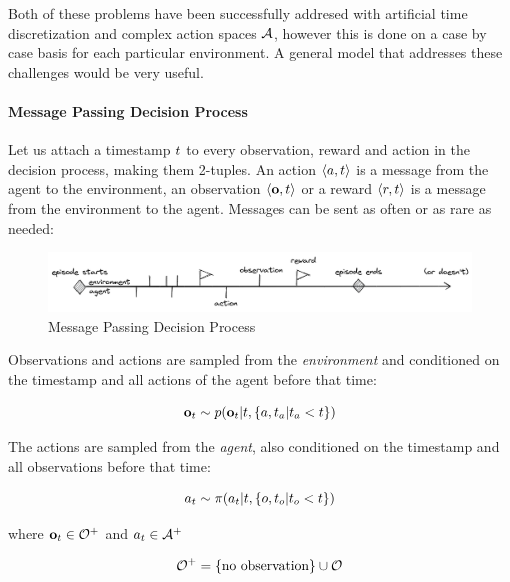 Both of these problems have been successfully addresed with artificial time discretization and complex action spaces $\mathcal{A}$, however this is done on a case by case basis for each particular environment. A general model that addresses these challenges would be very useful.

\paragraph{Message Passing Decision Process}

Let us attach a timestamp $t$ to every observation, reward and action in the decision process, making them 2-tuples. An action $\langle a, t\rangle$ is a message from the agent to the environment, an observation $\langle \mathbf{o}, t \rangle$ or a reward $\langle r, t \rangle$ is a message from the environment
to the agent. Messages can be sent as often or as rare as needed:

\begin{figure}
\centering
\includegraphics[width=\linewidth]{images/mpdp.png}
\caption{Message Passing Decision Process}
\end{figure}

Observations and actions are sampled from the \emph{environment} and conditioned on the timestamp and all actions of the agent before that time:

\begin{equation}
    \mathbf{o}_t \sim p(\mathbf{o}_t|t,\{a, t_a | t_a < t\})
\end{equation}

The actions are sampled from the \emph{agent}, also conditioned on the
timestamp and all observations before that time:

\begin{equation}
a_t \sim \pi(a_t|t, \{ o, t_o | t_o < t \})
\end{equation}

where $\mathbf{o}_t \in \mathcal{O}^{+}$
and $a_t \in \mathcal{A}^{+}$

\begin{equation}
    \mathcal{O}^{+} = \{\text{no observation} \} \cup \mathcal{O}
\end{equation}

